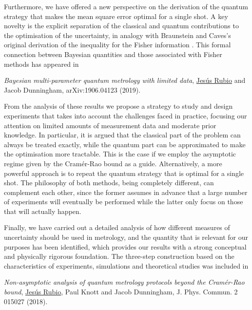 Furthermore, we have offered a new perspective on the derivation of the quantum strategy that makes the mean square error optimal for a single shot. A key novelty is the explicit separation of the classical and quantum contributions to the optimisation of the uncertainty, in analogy with Braunstein and Caves's original derivation of the inequality for the Fisher information \cite{BraunsteinCaves1994}. This formal connection between Bayesian quantities and those associated with Fisher methods has appeared in \cite{jesus2019b}
\begin{displayquote}
\emph{Bayesian multi-parameter quantum metrology with limited data}, \underline{Jes\'{u}s Rubio} and Jacob Dunningham, arXiv:1906.04123 (2019).
\end{displayquote}

From the analysis of these results we propose a strategy to study and design experiments that takes into account the challenges faced in practice, focusing our attention on limited amounts of measurement data and moderate prior knowledge. In particular, it is argued that the classical part of the problem can always be treated exactly, while the quantum part can be approximated to make the optimisation more tractable. This is the case if we employ the asymptotic regime given by the Cram\'{e}r-Rao bound as a guide. Alternatively, a more powerful approach is to repeat the quantum strategy that is optimal for a single shot. The philosophy of both methods, being completely different, can complement each other, since the former assumes in advance that a large number of experiments will eventually be performed while the latter only focus on those that will actually happen. 

Finally, we have carried out a detailed analysis of how different measures of uncertainty should be used in metrology, and the quantity that is relevant for our purposes has been identified, which provides our results with a strong conceptual and physically rigorous foundation. The three-step construction based on the characteristics of experiments, simulations and theoretical studies was included in \cite{jesus2017}
\begin{displayquote}
\emph{Non-asymptotic analysis of quantum metrology protocols beyond the Cram\'{e}r-Rao bound}, \underline{Jes\'{u}s Rubio}, Paul Knott and Jacob Dunningham, J. Phys. Commun. 2 015027 (2018).
\end{displayquote}
 